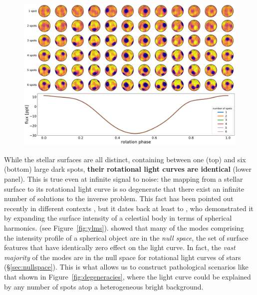 \documentclass[modern]{aastex62}
\begin{document}
\begin{figure}[t!]
    \begin{centering}
        \includegraphics[width=\linewidth]{figures/degeneracies.pdf}
    \end{centering}
\end{figure}

While the stellar surfaces are all distinct, containing between one (top)
and six (bottom) large dark spots,
\textbf{their rotational light curves are identical}
(lower panel). This is true even at infinite signal to
noise: the mapping from a stellar surface
to its rotational light curve is so degenerate that there exist an infinite number of solutions
to the inverse problem. This fact has been pointed out recently in different contexts
\citep[e.g.,][]{Cowan2013,Luger2019,Basri2020}, but it dates back at least to
\citet{Russell1906}, who demonstrated it by expanding the surface
intensity of a celestial body in terms of spherical harmonics.
(see Figure~\ref{fig:ylms}). \citet{Russell1906} showed
that many of the modes comprising the intensity profile of a spherical
object are in the \emph{null space}, the set of surface features that have identically
zero effect on the light curve. In fact,
the \emph{vast majority} of the modes are in the null space for rotational
light curves of stars (\S\ref{sec:nullspace}). This is what allows us to construct pathological
scenarios like that shown in Figure~\ref{fig:degeneracies}, where the light curve
could be explained by any number of spots atop a heterogeneous bright background.
\end{document}
